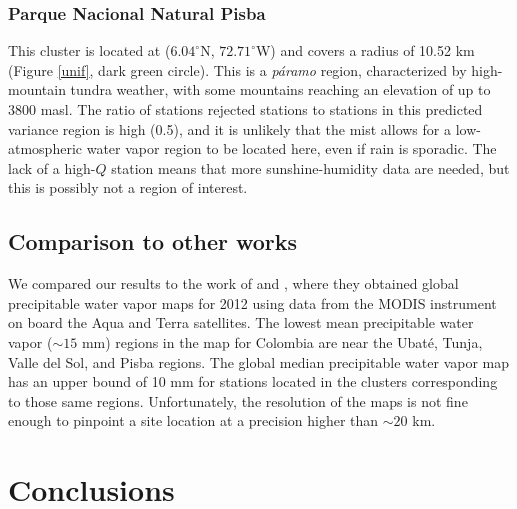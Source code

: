 \documentclass[12pt]{iopart}
\begin{document}
\subsubsection{Parque Nacional Natural Pisba}

This cluster is located at ($6.04^\circ$N, $72.71^\circ$W) and covers a radius of 10.52 km (Figure \ref{unif}, dark green circle). This is a \emph{p\'aramo} region, characterized by high-mountain tundra weather, with some mountains reaching an elevation of up to 3800 masl. The ratio of stations rejected stations to stations in this predicted variance region is high (0.5), and it is unlikely that the mist allows for a low-atmospheric water vapor region to be located here, even if rain is sporadic. The lack of a high-$Q$ station means that more sunshine-humidity data are needed, but this is possibly not a region of interest.

\subsection{Comparison to other works}

We compared our results to the work of   and , where they obtained global precipitable water vapor maps for 2012 using data from the MODIS instrument on board the Aqua and Terra satellites. The lowest mean precipitable water vapor ($\sim15$ mm) regions in the  map for Colombia are near the Ubat\'e, Tunja, Valle del Sol, and Pisba regions. The  global median precipitable water vapor map has an upper bound of 10 mm for stations located in the clusters corresponding to those same regions. Unfortunately, the resolution of the maps is not fine enough to pinpoint a site location at a precision higher than $\sim20$ km. 

\section{Conclusions}
\end{document}
